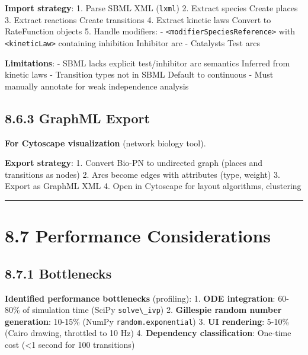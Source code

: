 \textbf{Import strategy}: 1. Parse SBML XML
(\passthrough{\lstinline!lxml!}) 2. Extract species \textrightarrow Create places 3.
Extract reactions \textrightarrow Create transitions 4. Extract kinetic laws \textrightarrow Convert
to RateFunction objects 5. Handle modifiers: -
\passthrough{\lstinline!<modifierSpeciesReference>!} with
\passthrough{\lstinline!<kineticLaw>!} containing inhibition \textrightarrow Inhibitor
arc - Catalysts \textrightarrow Test arcs

\textbf{Limitations}: - SBML lacks explicit test/inhibitor arc semantics
\textrightarrow Inferred from kinetic laws - Transition types not in SBML \textrightarrow Default to
continuous - Must manually annotate for weak independence analysis

\hypertarget{graphml-export}{%
\subsection{8.6.3 GraphML Export}\label{graphml-export}}

\textbf{For Cytoscape visualization} (network biology tool).

\textbf{Export strategy}: 1. Convert Bio-PN to undirected graph (places
and transitions as nodes) 2. Arcs become edges with attributes (type,
weight) 3. Export as GraphML XML 4. Open in Cytoscape for layout
algorithms, clustering

\begin{center}\rule{0.5\linewidth}{0.5pt}\end{center}

\hypertarget{performance-considerations}{%
\section{8.7 Performance
Considerations}\label{performance-considerations}}

\hypertarget{bottlenecks}{%
\subsection{8.7.1 Bottlenecks}\label{bottlenecks}}

\textbf{Identified performance bottlenecks} (profiling): 1. \textbf{ODE
integration}: 60-80\% of simulation time (SciPy
\passthrough{\lstinline!solve\_ivp!}) 2. \textbf{Gillespie random number
generation}: 10-15\% (NumPy
\passthrough{\lstinline!random.exponential!}) 3. \textbf{UI rendering}:
5-10\% (Cairo drawing, throttled to 10 Hz) 4. \textbf{Dependency
classification}: One-time cost (\textless1 second for 100 transitions)

